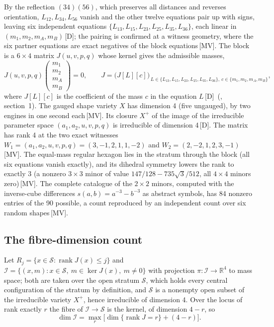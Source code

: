 \documentclass[11pt]{article}
\theoremstyle{definition}
\theoremstyle{remark}
\newcommand{\mk}[1]{\,{\scriptsize[#1]}}
\newcommand{\MV}{\mk{MV}}
\newcommand{\Dm}{\mk{D}}
\begin{document}
By the reflection $(34)(56)$, which preserves all distances and reverses orientation, $L_{12},L_{34},L_{56}$
vanish and the other twelve equations pair up with signs, leaving six independent equations
$\{L_{13},L_{15},L_{23},L_{25},L_{35},L_{36}\}$, each linear in $(m_1,m_2,m_A,m_B)$\Dm; the pairing is
confirmed at a witness geometry, where the six partner equations are exact negatives of the block
equations\MV. The block is a $6\times4$ matrix $J(u,v,p,q)$ whose kernel gives the admissible masses,
\begin{equation}\label{eq:kernel}
J(u,v,p,q)\begin{pmatrix}m_1\\ m_2\\ m_A\\ m_B\end{pmatrix}=0,\qquad
J=\bigl(J[L][c]\bigr)_{\,L\in\{L_{13},L_{15},L_{23},L_{25},L_{35},L_{36}\},\ c\in\{m_1,m_2,m_A,m_B\}},
\end{equation}
where $J[L][c]$ is the coefficient of the mass $c$ in the equation $L$\Dm\ (, section~1). %
The gauged shape variety $X$ has dimension 4 (five ungauged), by two engines in one second each\MV.
Its closure $X^{+}$ of the image of the irreducible parameter space $(a_1,a_2,u,v,p,q)$ is
irreducible of dimension 4\Dm. The matrix has rank 4 at the two exact witnesses
$W_1=(a_1,a_2,u,v,p,q)=(3,-1,2,1,1,-2)$ and $W_2=(2,-2,1,2,3,-1)$\MV. The equal-mass regular hexagon lies in
the stratum through the block (all six equations vanish exactly), and its dihedral symmetry lowers the
rank to exactly 3 (a nonzero $3\times3$ minor of value $147/128-735\sqrt3/512$, all $4\times4$ minors
zero)\MV. The complete catalogue of the $2\times2$ minors, computed with the inverse-cube differences
$s(a,b)=a^{-3}-b^{-3}$ as abstract symbols, has 84 nonzero entries of the 90 possible, a count reproduced
by an independent count over six random shapes\MV.

\subsection{The fibre-dimension count}

Let $R_j=\{x\in\mathcal S:\operatorname{rank}J(x)\le j\}$ and $\mathcal I=\{(x,m):x\in\mathcal S,\ m\in\ker J(x),\ m\ne0\}$ with
projection $\pi:\mathcal I\to\mathbb{R}^4$ to mass space; both are taken over the open stratum $\mathcal S$, which holds every central configuration of the stratum by definition, and
$\mathcal S$ is a nonempty open subset of the irreducible variety $X^{+}$, hence irreducible of dimension 4. Over the locus of rank exactly $r$ the fibre of $\mathcal I\to\mathcal S$ is
the kernel, of dimension $4-r$, so
\begin{equation}\label{eq:count}
\dim\mathcal I=\max_{r}\bigl[\dim\{\operatorname{rank}J=r\}+(4-r)\bigr].
\end{equation}
\end{document}
